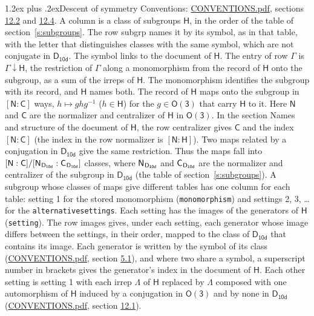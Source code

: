 \documentclass[10pt,a4paper]{article}
\makeatletter
\renewcommand\section{\@startsection{section}{1}{\z@}{-3ex plus -1ex minus -.2ex}%
  {1.2ex plus .2ex}{\normalfont\large\sffamily\bfseries\color{parttitle}}}
\numberwithin{equation}{section}
\newcommand{\grp}[1]{\mathsf{#1}}
\newcommand{\grpindex}[2]{[#1 : #2]}
\newcommand{\restr}[2]{#1\!\downarrow#2}
\newcommand{\hairsp}{\mkern1mu}
\makeatother
\begin{document}
\section{Descent of symmetry}\label{s:subduction}
Conventions: \href{../../CONVENTIONS.pdf}{CONVENTIONS.pdf}, sections \href{../../CONVENTIONS.pdf\#conv.12.2}{12.2} and \href{../../CONVENTIONS.pdf\#conv.12.4}{12.4}.
A column is a class of subgroups $\grp{H}$, in the order of the table of section~\ref{s:subgroups}. The row subgrp names it by its symbol, as in that table, with the letter that distinguishes classes with the same symbol, which are not conjugate in $\grp{D_{10d}}$. The symbol links to the document of $\grp{H}$. The entry of row $\Gamma$ is $\restr{\Gamma}{\grp{H}}$, the restriction of $\Gamma$ along a monomorphism from the record of $\grp{H}$ onto the subgroup, as a sum of the irreps of $\grp{H}$. The monomorphism identifies the subgroup with its record, and $\grp{H}$ names both. \label{n:group.normalizer.o3}\label{n:group.centralizer.o3}The record of $\grp{H}$ maps onto the subgroup in $\grpindex{\grp{N}}{\grp{C}}$ ways, $h \mapsto g h g^{-1}$ ($h \in \grp{H}$) for the $g \in \grp{O(3)}$ that carry $\grp{H}$ to it. Here $\grp{N}$ and $\grp{C}$ are the normalizer and centralizer of $\grp{H}$ in \href{O3.pdf}{$\grp{O(3)}$}. In the section Names and structure of the document of $\grp{H}$, the row centralizer gives $\grp{C}$ and the index $\grpindex{\grp{N}}{\grp{C}}$ (the index in the row normalizer is $\grpindex{\grp{N}}{\grp{H}}$). Two maps related by a conjugation in $\grp{D_{10d}}$ give the same restriction. Thus the maps fall into $\grpindex{\grp{N}}{\grp{C}}/\grpindex{\grp{N}_{\hairsp \grp{D_{10d}}}}{\grp{C}_{\hairsp \grp{D_{10d}}}}$ classes, where $\grp{N}_{\hairsp \grp{D_{10d}}}$ and $\grp{C}_{\hairsp \grp{D_{10d}}}$ are the normalizer and centralizer of the subgroup in $\grp{D_{10d}}$ (the table of section~\ref{s:subgroups}). \label{n:head.setting}A subgroup whose classes of maps give different tables has one column for each table: setting 1 for the stored monomorphism (\texttt{monomorphism}) and settings 2, 3, \dots{} for the \texttt{alternativesettings}. Each setting has the images of the generators of $\grp{H}$ (\texttt{setting}). \label{n:head.images}The row images gives, under each setting, each generator whose image differs between the settings, in their order, mapped to the class of $\grp{D_{10d}}$ that contains its image. \label{n:element.generator.index}Each generator is written by the symbol of its class (\href{../../CONVENTIONS.pdf}{CONVENTIONS.pdf}, section \href{../../CONVENTIONS.pdf\#conv.5.1}{5.1}), and where two share a symbol, a superscript number in brackets gives the generator's index in the document of $\grp{H}$. \label{n:irrep.Delta}Each other setting is setting 1 with each irrep $\Lambda$ of $\grp{H}$ replaced by $\Lambda$ composed with one automorphism of $\grp{H}$ induced by a conjugation in \href{O3.pdf}{$\grp{O(3)}$} and by none in $\grp{D_{10d}}$ (\href{../../CONVENTIONS.pdf}{CONVENTIONS.pdf}, section \href{../../CONVENTIONS.pdf\#conv.12.1}{12.1}).
\end{document}
